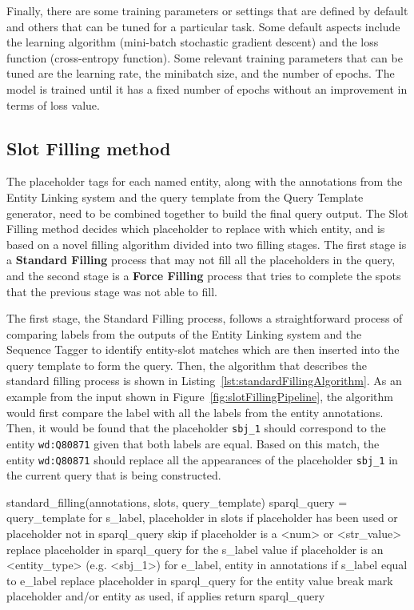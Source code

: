 Finally, there are some training parameters or settings that are defined by default and 
others that can be tuned for a particular task. Some default aspects include the learning 
algorithm (mini-batch stochastic gradient descent) and the loss function (cross-entropy 
function). Some relevant training parameters that can be tuned are the learning rate, the 
minibatch size, and the number of epochs. The model is trained until it has a fixed number of 
epochs without an improvement in terms of loss value.

\subsection{Slot Filling method}
\label{cap3:system/slotFillModule/fillingMethod}
The placeholder tags for each named entity, along with the annotations from the Entity 
Linking system and the query template from the Query Template generator, need to be combined 
together to build the final \SPARQL{} query output. The Slot Filling method decides which 
placeholder to replace with which entity, and is based on a novel filling algorithm divided 
into two filling stages. The first stage is a \textbf{Standard Filling} process that may not 
fill all the placeholders in the query, and the second stage is a \textbf{Force Filling} 
process that tries to complete the spots that the previous stage was not able to fill.

The first stage, the Standard Filling process, follows a straightforward process of comparing 
labels from the outputs of the Entity Linking system and the Sequence Tagger to identify 
entity-slot matches which are then inserted into the query template to form the \SPARQL{} query. 
Then, the algorithm that describes the standard filling process is shown in 
Listing~\ref{lst:standardFillingAlgorithm}. As an example from the input shown in 
Figure~\ref{fig:slotFillingPipeline}, the algorithm would first compare the label 
 with all the labels from the entity annotations. Then, it would 
be found that the placeholder \texttt{sbj\_1} should correspond to the entity 
\texttt{wd:Q80871} given that both labels are equal. Based on this match, the entity 
\texttt{wd:Q80871} should replace all the appearances of the placeholder \texttt{sbj\_1} in 
the current \SPARQL{} query that is being constructed.

\begin{sparqlcode}[%
    caption={Standard Filling algorithm.}, 
    label={lst:standardFillingAlgorithm}]
standard_filling(annotations, slots, query_template)
    sparql_query = query_template
    for s_label, placeholder in slots
        if placeholder has been used or placeholder not in sparql_query
            skip
        if placeholder is a <num> or <str_value>
            replace placeholder in sparql_query for the s_label value
        if placeholder is an <entity_type> (e.g. <sbj_1>)
            for e_label, entity in annotations
                if s_label equal to e_label
                    replace placeholder in sparql_query for the entity value
                    break
        mark placeholder and/or entity as used, if applies
    return sparql_query
\end{sparqlcode}

